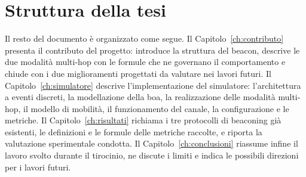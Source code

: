 \section{Struttura della tesi}
\label{sec:intro-struttura}
Il resto del documento \`e organizzato come segue. 
Il Capitolo~\ref{ch:contributo} presenta il contributo del progetto: introduce
la struttura del beacon, descrive le due modalit\`a multi-hop con le formule che ne governano il comportamento e
chiude con i due miglioramenti progettati da valutare nei lavori futuri. 
Il Capitolo~\ref{ch:simulatore} descrive l'implementazione del simulatore: l'architettura a eventi
discreti, la modellazione della boa, la realizzazione delle modalit\`a
multi-hop, il modello di mobilit\`a, il funzionamento del canale, la configurazione e le metriche. 
Il Capitolo~\ref{ch:risultati} richiama i tre
protocolli di beaconing gi\`a esistenti, le definizioni e le formule delle metriche raccolte, e riporta la
valutazione sperimentale condotta. 
Il Capitolo~\ref{ch:conclusioni} riassume infine il lavoro svolto durante il tirocinio, 
ne discute i limiti e indica le possibili direzioni per i lavori futuri.